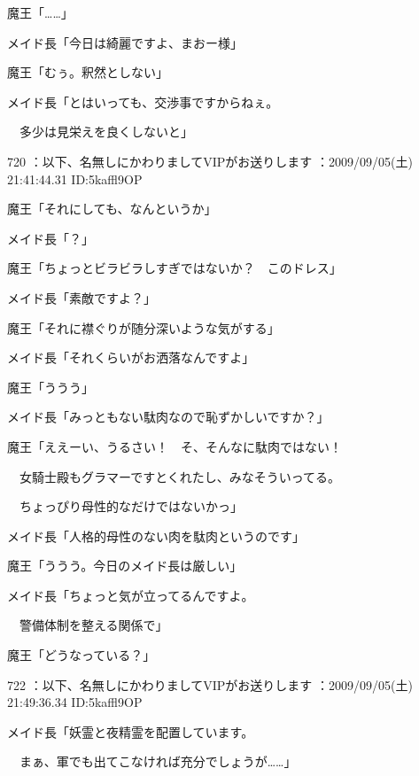 \documentclass[a4j,twocolumn]{tarticle}
\begin{document}
魔王「……」 



メイド長「今日は綺麗ですよ、まおー様」\par{} 
魔王「むぅ。釈然としない」 



メイド長「とはいっても、交渉事ですからねぇ。\par{} 
　多少は見栄えを良くしないと」

	
    
    

720 ：以下、名無しにかわりましてVIPがお送りします ：2009/09/05(土) 21:41:44.31 ID:5kaffl9OP 


魔王「それにしても、なんというか」\par{} 
メイド長「？」 



魔王「ちょっとビラビラしすぎではないか？　このドレス」\par{} 
メイド長「素敵ですよ？」 



魔王「それに襟ぐりが随分深いような気がする」\par{} 
メイド長「それくらいがお洒落なんですよ」 



魔王「ううう」\par{} 
メイド長「みっともない駄肉なので恥ずかしいですか？」 



魔王「ええーい、うるさい！　そ、そんなに駄肉ではない！\par{} 
　女騎士殿もグラマーですとくれたし、みなそういってる。\par{} 
　ちょっぴり母性的なだけではないかっ」 



メイド長「人格的母性のない肉を駄肉というのです」\par{} 
魔王「ううう。今日のメイド長は厳しい」 



メイド長「ちょっと気が立ってるんですよ。\par{} 
　警備体制を整える関係で」 



魔王「どうなっている？」 

	
    
    

722 ：以下、名無しにかわりましてVIPがお送りします ：2009/09/05(土) 21:49:36.34 ID:5kaffl9OP 


メイド長「妖霊と夜精霊を配置しています。\par{} 
　まぁ、軍でも出てこなければ充分でしょうが……」 
\end{document}
